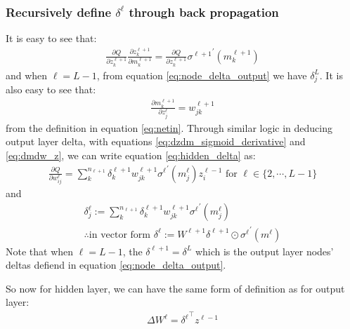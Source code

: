 \documentclass{article} [10pt] %
\begin{document}
\subsubsection{Recursively define $\delta^\ell$ through back propagation}
It is easy to see that:
\begin{align}
\frac{\partial Q}{\partial z^{\ell+1}_{k}}\frac{\partial z^{\ell+1}_{k}}{\partial m^{\ell+1}_{k}} = \frac{\partial Q}{\partial z^{\ell+1}_{k}}{\sigma^{\ell+1}}^\prime(m^{\ell+1}_{k})
\end{align}
and when $\ell=L-1$, from equation \eqref{eq:node_delta_output} we have $\delta^L_j$. It is also easy to see that:
\begin{align}
	\frac{\partial m^{\ell+1}_{k}}{\partial z^\ell_j} = w^{\ell+1}_{jk}
\end{align}
from the definition in equation \eqref{eq:netin}. Through similar logic in deducing output layer delta, with equations \eqref{eq:dzdm_sigmoid_derivative}  and \eqref{eq:dmdw_z}, we can write equation \eqref{eq:hidden_delta} as:
\begin{align}
	\frac{\partial Q}{\partial w^\ell_{ij}} = \sum_k^{n_{\ell+1}}\delta^{\ell+1}_kw^{\ell+1}_{jk}
							{\sigma^{\ell}}^\prime(m^{\ell}_j)z^{\ell-1}_i
\text{ for } \ell \in \{2, \cdots, L-1\}
\end{align}
and 
\begin{align}
\boxed{
	\delta^\ell_j := \sum_k^{n_{\ell+1}}\delta^{\ell+1}_kw^{\ell+1}_{jk}{\sigma^{\ell}}^\prime(m^{\ell}_j)
} \\
\boxed{
	\therefore \text{in vector form }  \delta^\ell := W^{\ell+1}{\delta^{\ell+1}} \odot {\sigma^{\ell}}^\prime(m^{\ell})
}
\end{align}
Note that when $\ell=L-1$, the $\delta^{\ell+1}=\delta^L$ which is the output layer nodes' deltas defiend in equation \eqref{eq:node_delta_output}.

So now for hidden layer, we can have the same form of definition as for output layer:
\begin{align} \label{eq:delta_w_hidden}
\boxed{
	\Delta W^\ell = {\delta^{\ell}}^\top z^{\ell-1}
}
\end{align}
\end{document}
